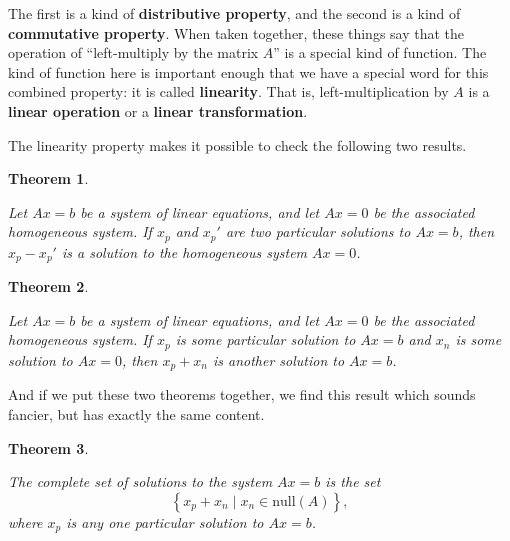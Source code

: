 \documentclass[10pt,]{book}
\newcommand{\terminology}[1]{\textbf{#1}}
\theoremstyle{plain}
\newtheorem{theorem}{Theorem}[chapter]
\numberwithin{equation}{section}
\begin{document}
      The first is a kind of \terminology{distributive property}, and the second
      is a kind of \terminology{commutative property}. When taken together, these
      things say that the operation of ``left-multiply by the matrix \(A\)''
      is a special kind of function. The kind of function here is important
      enough that we have a special word for this combined property: it is
      called \terminology{linearity}. That is, left-multiplication by \(A\) is a
      \terminology{linear operation} or a \terminology{linear transformation}.
\par

      The linearity property makes it possible to check the following two results.
\begin{theorem}\label{theorem-4}

        Let \(Ax=b\) be a system of linear equations, and let \(Ax=0\) be
        the associated homogeneous system. If \(x_p\) and \(x_p'\) are
        two particular solutions to \(Ax=b\), then \(x_p - x_p'\) is a
        solution to the homogeneous system \(Ax=0\).
      \end{theorem}
\begin{theorem}\label{theorem-5}

        Let \(Ax=b\) be a system of linear equations, and let \(Ax=0\)
        be the associated homogeneous system.
        If \(x_p\) is some particular solution to \(Ax=b\) and
        \(x_n\) is some solution to \(Ax=0\), then \(x_p + x_n\) is
        another solution to \(Ax=b\).
      \end{theorem}
\par

      And if we put these two theorems together, we find this result which
      sounds fancier, but has exactly the same content.
\begin{theorem}\label{theorem-6}

        The complete set of solutions to the system \(Ax=b\) is the set
        \[
          \left\{ x_p + x_n \mid x_n \in \mathrm{null}(A) \right\},
        \]
        where \(x_p\) is any one particular solution to \(Ax=b\).
      \end{theorem}
\par
\end{document}
